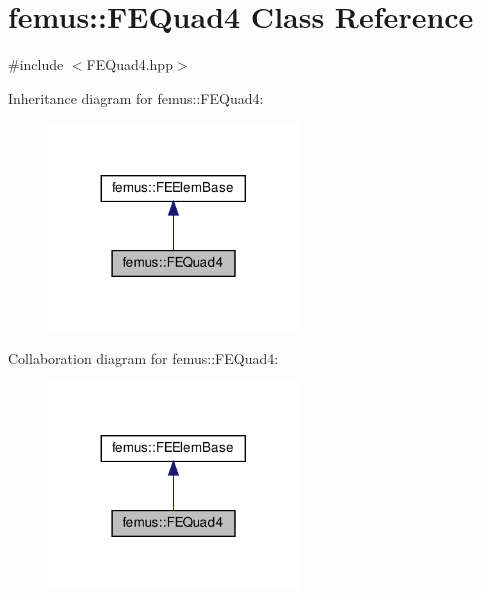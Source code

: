\hypertarget{classfemus_1_1_f_e_quad4}{}\section{femus\+:\+:F\+E\+Quad4 Class Reference}
\label{classfemus_1_1_f_e_quad4}


{\ttfamily \#include $<$F\+E\+Quad4.\+hpp$>$}



Inheritance diagram for femus\+:\+:F\+E\+Quad4\+:
\nopagebreak
\begin{figure}[H]
\begin{center}
\leavevmode
\includegraphics[width=188pt]{classfemus_1_1_f_e_quad4__inherit__graph}
\end{center}
\end{figure}


Collaboration diagram for femus\+:\+:F\+E\+Quad4\+:
\nopagebreak
\begin{figure}[H]
\begin{center}
\leavevmode
\includegraphics[width=188pt]{classfemus_1_1_f_e_quad4__coll__graph}
\end{center}
\end{figure}

